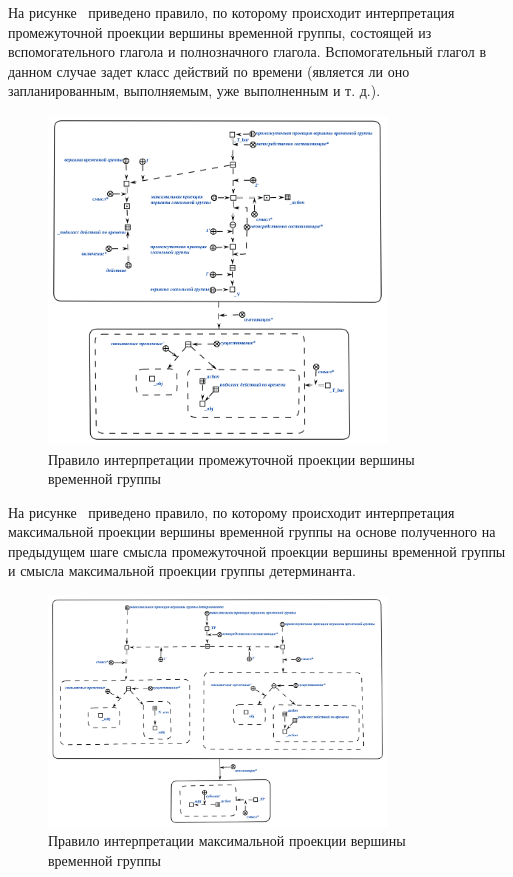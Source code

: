 На рисунке~\textit{} приведено правило, по которому происходит интерпретация промежуточной проекции вершины временной группы, состоящей из вспомогательного глагола и полнозначного глагола.
Вспомогательный глагол в данном случае задет класс действий по времени (является ли оно запланированным, выполняемым, уже выполненным и т. д.).

\begin{figure}[h]
    \centering
    \includegraphics[width=0.8\textwidth]{images/part2/chapter_lang/d_sem_5.png}
    \caption{Правило интерпретации промежуточной проекции вершины временной группы}
    \label{fig:d_sem_5}
\end{figure}

На рисунке~\textit{} приведено правило, по которому происходит интерпретация максимальной проекции вершины временной группы на основе полученного на предыдущем шаге смысла промежуточной проекции вершины временной группы и смысла максимальной проекции группы детерминанта.

\begin{figure}[h]
    \centering
    \includegraphics[width=0.8\textwidth]{images/part2/chapter_lang/d_sem_6.png}
    \caption{Правило интерпретации максимальной проекции вершины временной группы}
    \label{fig:d_sem_6}
\end{figure}

